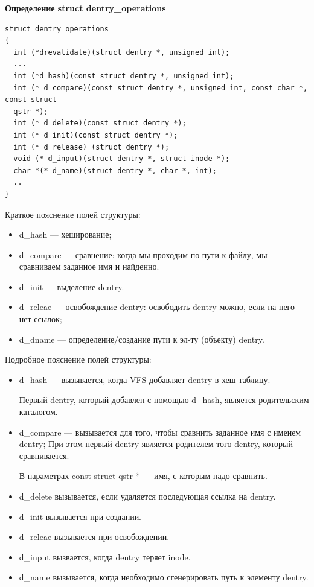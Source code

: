 \textbf{Определение struct dentry\_operations}

\begin{lstlisting}
struct dentry_operations
{
  int (*drevalidate)(struct dentry *, unsigned int);
  ...
  int (*d_hash)(const struct dentry *, unsigned int);
  int (* d_compare)(const struct dentry *, unsigned int, const char *, const struct
  qstr *);
  int (* d_delete)(const struct dentry *);
  int (* d_init)(const struct dentry *);
  int (* d_release) (struct dentry *);
  void (* d_input)(struct dentry *, struct inode *);
  char *(* d_name)(struct dentry *, char *, int);
  ..
}
\end{lstlisting}

Краткое пояснение полей структуры:
\begin{itemize}
\item d\_hash — хеширование;
\item d\_compare — сравнение: когда мы проходим по пути к файлу, мы сравниваем заданное имя и найденно.
\item d\_init — выделение dentry.
\item d\_releae — освобождение dentry: освободить dentry можно, если на него нет ссылок;
\item d\_dname — определение/создание пути к эл-ту (объекту) dentry.
\end{itemize}

Подробное пояснение полей структуры:
\begin{itemize}
\item d\_hash — вызывается, когда VFS добавляет dentry в хеш-таблицу.

Первый dentry, который добавлен с помощью d\_hash, является родительским каталогом.
\item d\_compare — вызывается для того, чтобы сравнить заданное имя с именем dentry; При этом первый dentry является родителем того dentry, который сравнивается.

В параметрах const struct qstr * — имя, с которым надо сравнить.
\item d\_delete вызывается, если удаляется последующая ссылка на dentry.
\item d\_init вызывается при создании.
\item d\_releae вызывается при освобождении.
\item d\_input вызвается, когда dentry теряет inode.
\item d\_name вызывается, когда необходимо сгенерировать путь к элементу dentry.
\end{itemize}

